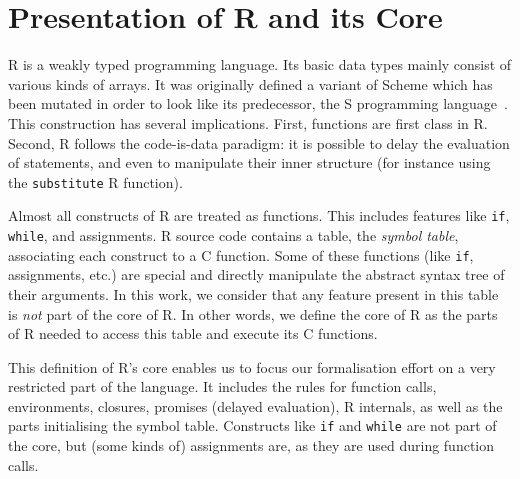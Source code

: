 \documentclass[9pt, sigplan, natbib=false, screen=true]{acmart}
\newcommand\R{R}
\newcommand\Cn{C}
\begin{document}
\section{Presentation of \R{} and its Core}
\label{sec:presentation}

\R{} is a weakly typed programming language.
Its basic data types mainly consist of various kinds of arrays.
It was originally defined a variant of Scheme
which has been mutated in order to look like its predecessor,
the S programming language~\parencite{ihaka1996r}.
This construction has several implications.
First, functions are first class in \R{}.
Second, \R{} follows the code-is-data paradigm:
it is possible to delay the evaluation of statements,
and even to manipulate their inner structure
(for instance using the \texttt{substitute} \R{} function).

Almost all constructs of \R{} are treated as functions.
This includes features like \texttt{if}, \texttt{while},
and assignments.
\R{} source code contains a table,
the \emph{symbol table},
associating each construct to a \Cn{} function.
Some of these functions (like \texttt{if}, assignments, etc.)
are special and directly manipulate the abstract syntax tree
of their arguments.
%
In this work,
we consider that any feature present in this table
is \emph{not} part of the core of \R{}.
In other words, we define the core of \R{}
as the parts of \R{} needed to access this table
and execute its \Cn{} functions.

This definition of \R{}'s core enables us to focus
our formalisation effort on a very restricted part of the language.
It includes the rules for function calls,
environments, closures, promises (delayed evaluation), \R{} internals,
as well as the parts initialising the symbol table.
Constructs like \texttt{if} and \texttt{while}
are not part of the core,
but (some kinds of) assignments are,
as they are used during function calls.
\end{document}
